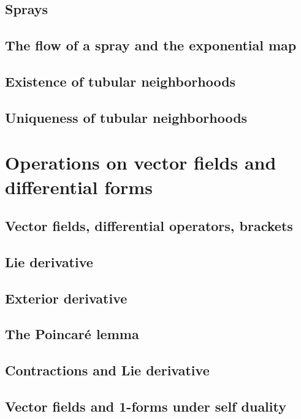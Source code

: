 \documentclass[a4paper]{article}
\begin{document}
\subsection{Sprays}

\subsection{The flow of a spray and the exponential map}

\subsection{Existence of tubular neighborhoods}

\subsection{Uniqueness of tubular neighborhoods}

\section{Operations on vector fields and differential forms}

\subsection{Vector fields, differential operators, brackets}

\subsection{Lie derivative}

\subsection{Exterior derivative}

\subsection{The Poincar\'e lemma}

\subsection{Contractions and Lie derivative}

\subsection{Vector fields and 1-forms under self duality}
\end{document}
